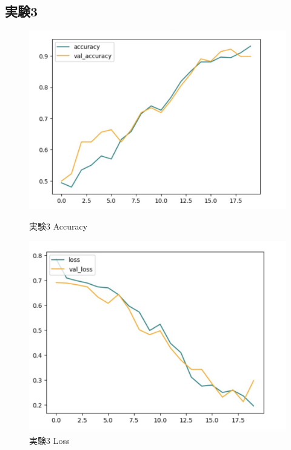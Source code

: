 \documentclass[a4paper, 11pt, titlepage]{jsarticle}
\begin{document}
\subsection{実験3}
\begin{figure}[htbp]
  \begin{minipage}[b]{0.45\linewidth}
    \centering
    \includegraphics[keepaspectratio, scale=0.161]{ex3_acc.jpg}
    \caption{実験3 Accuracy}
  \end{minipage}
  \begin{minipage}[b]{0.45\linewidth}
    \centering
    \includegraphics[keepaspectratio, scale=0.161]{ex3_loss.jpg}
    \caption{実験3 Loss}
  \end{minipage}
\end{figure}
\end{document}

